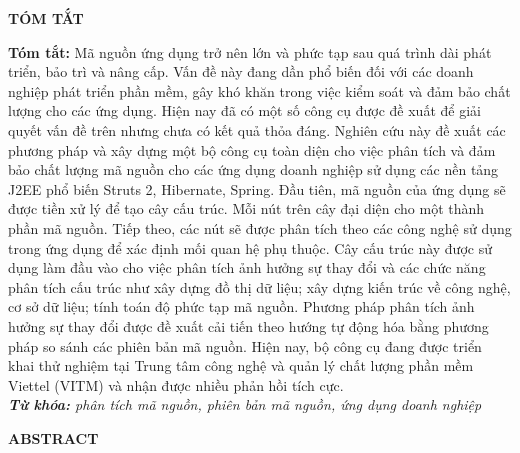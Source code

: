 \documentclass[12pt,a4paper]{report}
\begin{document}
	
\newpage
\begin{titlepage}
\begin{center}
	\textbf{\large TÓM TẮT}
\end{center}
\textbf{Tóm tắt:} Mã nguồn ứng dụng trở nên lớn và phức tạp sau quá trình dài phát triển, bảo trì và nâng cấp. Vấn đề này đang dần phổ biến đối với các doanh nghiệp phát triển phần mềm, gây khó khăn trong việc kiểm soát và đảm bảo chất lượng cho các ứng dụng. Hiện nay đã có một số công cụ được đề xuất để giải quyết vấn đề trên nhưng chưa có kết quả thỏa đáng. Nghiên cứu này đề xuất các phương pháp và xây dựng một bộ công cụ toàn diện cho việc phân tích và đảm bảo chất lượng mã nguồn cho các ứng dụng doanh nghiệp sử dụng các nền tảng J2EE phổ biến Struts 2, Hibernate, Spring. Đầu tiên, mã nguồn của ứng dụng sẽ được tiền xử lý để tạo cây cấu trúc. Mỗi nút trên cây đại diện cho một thành phần mã nguồn. Tiếp theo, các nút sẽ được phân tích theo các công nghệ sử dụng trong ứng dụng để xác định mối quan hệ phụ thuộc. Cây cấu trúc này được sử dụng làm đầu vào cho việc phân tích ảnh hưởng sự thay đổi và các chức năng phân tích cấu trúc như xây dựng đồ thị dữ liệu; xây dựng kiến trúc về công nghệ, cơ sở dữ liệu; tính toán độ phức tạp mã nguồn. Phương pháp phân tích ảnh hưởng sự thay đổi được đề xuất cải tiến theo hướng tự động hóa bằng phương pháp so sánh các phiên bản mã nguồn. Hiện nay, bộ công cụ đang được triển khai thử nghiệm tại Trung tâm công nghệ và quản lý chất lượng phần mềm Viettel (VITM) và nhận được nhiều phản hồi tích cực.\\

\noindent \textit{\textbf{Từ khóa:} phân tích mã nguồn, phiên bản mã nguồn, ứng dụng doanh nghiệp}
\end{titlepage}

\newpage
\begin{titlepage}
\begin{center}
	\textbf{\large ABSTRACT}
\end{center}
\end{titlepage}
\end{document}
